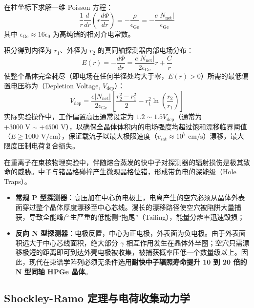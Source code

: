 在柱坐标下求解一维 Poisson 方程：
\begin{equation}
    \frac{1}{r} \frac{d}{dr} \left( r \frac{d\Phi}{dr} \right) = -\frac{\rho}{\epsilon_{\text{Ge}}} = -\frac{e |N_{\text{net}}|}{\epsilon_{\text{Ge}}}
    \label{eq:poisson_coaxial}
\end{equation}
其中 $\epsilon_{\text{Ge}} \approx 16 \epsilon_0$ 为高纯锗的相对介电常数。

积分得到内径为 $r_1$、外径为 $r_2$ 的真同轴探测器内部电场分布：
\begin{equation}
    E(r) = -\frac{d\Phi}{dr} = \frac{e |N_{\text{net}}|}{2 \epsilon_{\text{Ge}}} r + \frac{C}{r}
    \label{eq:coaxial_field}
\end{equation}
使整个晶体完全耗尽（即电场在任何半径处均大于零，$E(r) > 0$）所需的最低偏置电压称为（Depletion Voltage, $V_{\text{dep}}$）：
\begin{equation}
    V_{\text{dep}} = \frac{e |N_{\text{net}}|}{2 \epsilon_{\text{Ge}}} \left[ \frac{r_2^2 - r_1^2}{2} - r_1^2 \ln\left(\frac{r_2}{r_1}\right) \right]
    \label{eq:depletion_voltage}
\end{equation}
实际实验操作中，工作偏置高压通常设定为 $1.2 \sim 1.5 V_{\text{dep}}$（通常为 $+3000\text{ V} \sim +4500\text{ V}$），以确保全晶体体积内的电场强度均超过饱和漂移临界阈值（$E \ge 1000\text{ V/cm}$），保证载流子以最大极限速度（$v_{\text{sat}} \approx 10^7\text{ cm/s}$）漂移，最大限度压制电荷复合损失。

在重离子在束核物理实验中，伴随熔合蒸发的快中子对探测器的辐射损伤是极其致命的威胁。中子与锗晶格碰撞产生微观晶格位错，形成带负电的深能级（Hole Traps）。
\begin{itemize}
    \item \textbf{常规 P 型探测器}：高压加在中心负电极上，电离产生的空穴必须从晶体外表面穿过整个晶体厚度漂移至中心芯线。漫长的漂移路径使空穴被陷阱大量捕获，导致全能峰产生严重的低能侧“拖尾”（Tailing），能量分辨率迅速毁损；
    \item \textbf{反向 N 型探测器}：电极反置，中心为正电极，外表面为负电极。由于外表面积远大于中心芯线面积，绝大部分 $\gamma$ 相互作用发生在晶体外半圈；空穴只需漂移极短的距离即可到达外壳电极被收集，被捕获概率压低一个数量级以上。因此，现代在束谱学阵列必须无条件选用\textbf{耐快中子辐照寿命提升 10 到 20 倍的 N 型同轴 HPGe 晶体}。
\end{itemize}

\subsection{Shockley-Ramo 定理与电荷收集动力学}


